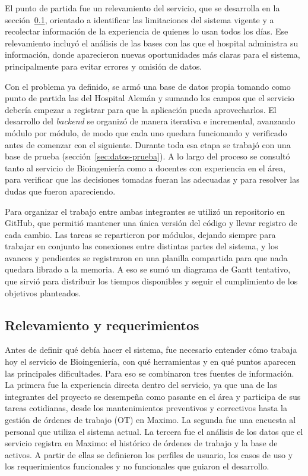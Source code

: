 \documentclass[10pt]{article}
\begin{document}
El punto de partida fue un relevamiento del servicio, que se desarrolla en la sección~\ref{sec:relevamiento}, orientado a identificar las limitaciones del sistema vigente y a recolectar información de la experiencia de quienes lo usan todos los días. Ese relevamiento incluyó el análisis de las bases con las que el hospital administra su información, donde aparecieron nuevas oportunidades más claras para el sistema, principalmente para evitar errores y omisión de datos. 

Con el problema ya definido, se armó una base de datos propia tomando como punto de partida las del Hospital Alemán y sumando los campos que el servicio debería empezar a registrar para que la aplicación pueda aprovecharlos. El desarrollo del \textit{backend} se organizó de manera iterativa e incremental, avanzando módulo por módulo, de modo que cada uno quedara funcionando y verificado antes de comenzar con el siguiente. Durante toda esa etapa se trabajó con una base de prueba (sección~\ref{sec:datos-prueba}). A lo largo del proceso se consultó tanto al servicio de Bioingeniería como a docentes con experiencia en el área, para verificar que las decisiones tomadas fueran las adecuadas y para resolver las dudas que fueron apareciendo. 

Para organizar el trabajo entre ambas integrantes se utilizó un repositorio en GitHub, que permitió mantener una única versión del código y llevar registro de cada cambio. Las tareas se repartieron por módulos, dejando siempre para trabajar en conjunto las conexiones entre distintas partes del sistema, y los avances y pendientes se registraron en una planilla compartida para que nada quedara librado a la memoria. A eso se sumó un diagrama de Gantt tentativo, que sirvió para distribuir los tiempos disponibles y seguir el cumplimiento de los objetivos planteados.

\subsection{Relevamiento y requerimientos}
\label{sec:relevamiento}
Antes de definir qué debía hacer el sistema, fue necesario entender cómo trabaja hoy el servicio de Bioingeniería, con qué herramientas y en qué puntos aparecen las principales dificultades. Para eso se combinaron tres fuentes de información. La primera fue la experiencia directa dentro del servicio, ya que una de las integrantes del proyecto se desempeña como pasante en el área y participa de sus tareas cotidianas, desde los mantenimientos preventivos y correctivos hasta la gestión de órdenes de trabajo (OT) en Maximo. La segunda fue una encuesta al personal que utiliza el sistema actual. La tercera fue el análisis de los datos que el servicio registra en Maximo: el histórico de órdenes de trabajo y la base de activos.  A partir de ellas se definieron los perfiles de usuario, los casos de uso y los requerimientos funcionales y no funcionales que guiaron el desarrollo. 
\end{document}
